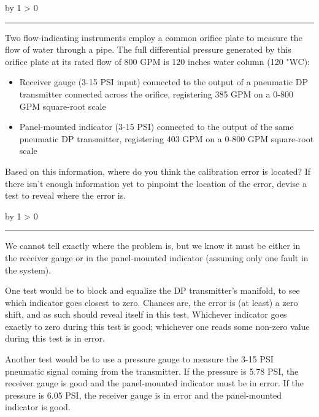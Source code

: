 \documentclass[12pt,a4paper]{article}
\def\oppgave{
            \advance\questnum by 1
            \ifnum \questnum > 0
                 \hrule
                 \vskip 3pt
                 \leftline{Oppgave \the\questnum}
                 \vskip 3pt \fi}
\def\svar{
           \advance\answnum by 1
           \ifnum \answnum > 0
                \hrule
                \vskip 3pt
                \leftline{Svar \the\answnum}
                \vskip 3pt \fi}
\begin{document}
\vfil \eject 



\oppgave{} 

Two flow-indicating instruments employ a common orifice plate to measure the flow of water through a pipe.  The full differential pressure generated by this orifice plate at its rated flow of 800 GPM is 120 inches water column (120 "WC):

\vskip 10pt

\begin{itemize}
\item{} Receiver gauge (3-15 PSI input) connected to the output of a pneumatic DP transmitter connected across the orifice, registering 385 GPM on a 0-800 GPM square-root scale
\vskip 10pt
\item{} Panel-mounted indicator (3-15 PSI) connected to the output of the same pneumatic DP transmitter, registering 403 GPM on a 0-800 GPM square-root scale
\end{itemize}

\vskip 10pt

Based on this information, where do you think the calibration error is located?  If there isn't enough information yet to pinpoint the location of the error, devise a test to reveal where the error is.

\vskip 10pt \filbreak 





\svar{} 

We cannot tell exactly where the problem is, but we know it must be either in the receiver gauge or in the panel-mounted indicator (assuming only one fault in the system).

\vskip 10pt

One test would be to block and equalize the DP transmitter's manifold, to see which indicator goes closest to zero.  Chances are, the error is (at least) a zero shift, and as such should reveal itself in this test.  Whichever indicator goes exactly to zero during this test is good; whichever one reads some non-zero value during this test is in error.

\vskip 10pt

Another test would be to use a pressure gauge to measure the 3-15 PSI pneumatic signal coming from the transmitter.  If the pressure is 5.78 PSI, the receiver gauge is good and the panel-mounted indicator must be in error.  If the pressure is 6.05 PSI, the receiver gauge is in error and the panel-mounted indicator is good.
\end{document}
